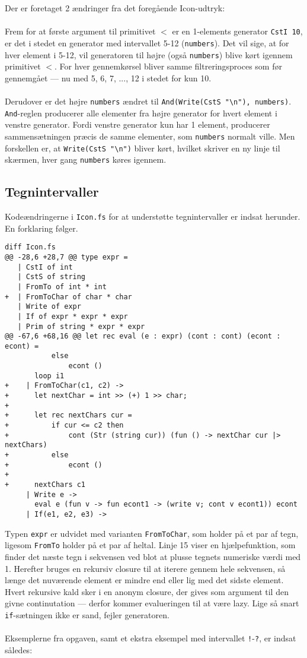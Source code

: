 Der er foretaget 2 ændringer fra det foregående Icon-udtryk:
\\\\
Frem for at første argument til primitivet $<$ er en 1-elements generator \texttt{CstI 10}, er det i stedet en generator med intervallet 5-12 (\texttt{numbers}). Det vil sige, at for hver element i 5-12, vil generatoren til højre (også \texttt{numbers}) blive kørt igennem primitivet $<$. For hver gennemkørsel bliver samme filtreringsproces som før gennemgået --- nu med 5, 6, 7, ..., 12 i stedet for kun 10.
\\\\
Derudover er det højre \texttt{numbers} ændret til \texttt{And(Write(CstS "\textbackslash n"), numbers)}. \texttt{And}-reglen producerer alle elementer fra højre generator for hvert element i venstre generator. Fordi venstre generator kun har 1 element, producerer sammensætningen præcis de samme elementer, som \texttt{numbers} normalt ville. Men forskellen er, at \texttt{Write(CstS "\textbackslash n")} bliver kørt, hvilket skriver en ny linje til skærmen, hver gang \texttt{numbers} køres igennem.

\subsection{Tegnintervaller}

Kodeændringerne i \texttt{Icon.fs} for at understøtte tegnintervaller er indsat herunder. En forklaring følger.

\begin{verbatim}
diff Icon.fs
@@ -28,6 +28,7 @@ type expr =
   | CstI of int
   | CstS of string
   | FromTo of int * int
+  | FromToChar of char * char
   | Write of expr
   | If of expr * expr * expr
   | Prim of string * expr * expr 
@@ -67,6 +68,16 @@ let rec eval (e : expr) (cont : cont) (econt : econt) =
           else 
               econt ()
       loop i1
+    | FromToChar(c1, c2) ->
+      let nextChar = int >> (+) 1 >> char;
+
+      let rec nextChars cur =
+          if cur <= c2 then
+              cont (Str (string cur)) (fun () -> nextChar cur |> nextChars)
+          else
+              econt ()
+
+      nextChars c1
     | Write e -> 
       eval e (fun v -> fun econt1 -> (write v; cont v econt1)) econt
     | If(e1, e2, e3) -> 
\end{verbatim}

Typen \texttt{expr} er udvidet med varianten \texttt{FromToChar}, som holder på et par af tegn, ligesom \texttt{FromTo} holder på et par af heltal. Linje 15 viser en hjælpefunktion, som finder det næste tegn i sekvensen ved blot at plusse tegnets numeriske værdi med 1. Herefter bruges en rekursiv closure til at iterere gennem hele sekvensen, så længe det nuværende element er mindre end eller lig med det sidste element. Hvert rekursive kald sker i en anonym closure, der gives som argument til den givne continutation --- derfor kommer evalueringen til at være lazy. Lige så snart \texttt{if}-sætningen ikke er sand, fejler generatoren.
\\\\
Eksemplerne fra opgaven, samt et ekstra eksempel med intervallet \texttt{!}-\texttt{?}, er indsat således:

